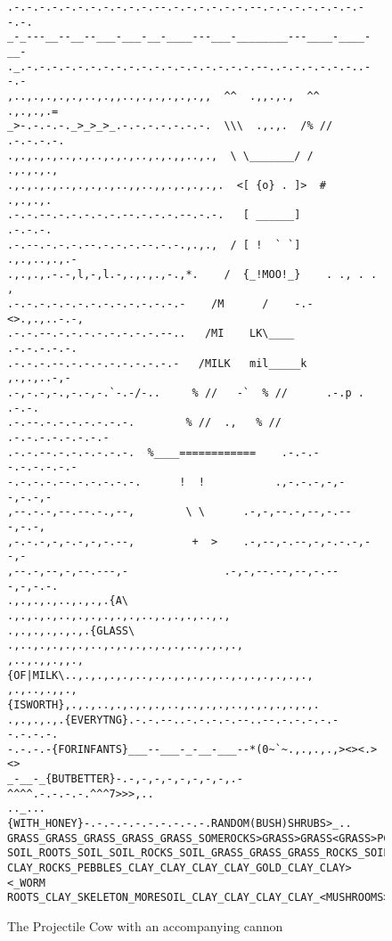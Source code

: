 \documentclass{metanorma}
\begin{document}
\begin{figure}[h]\centering
  \label{projectile-cow}
  \caption{The Projectile Cow with an accompanying cannon}
  \begin{verbatim}
.-.-.-.-.-.-.-.-.-.-.-.--.-.-.-.-.-.-.--.-.-.-.-.-.-.-.--.-.
_-_---__--__--___-___-__-____---___-________---____-____-__-
._.-.-.-.-.-.-.-.-.-.-.-.-.-.-.-.-.-.-.--..-.-.-.-.-.-..--.-
,..,.,.,.,.,..,.,,..,.,.,.,.,.,,  ^^  .,,.,.,  ^^   .,.,.,.=
_>-.-.-.-._>_>_>_.-.-.-.-.-.-.-.  \\\  .,.,.  /% // .-.-.-.-.
.,.,.,.,..,.,..,.,.,..,.,.,,..,.,  \ \_______/ /    .,.,.,.,
.,.,.,.,..,.,.,.,..,,..,,.,.,.,.,.  <[ {o} . ]>  #   .,.,.,.
.-.-.--.-.-.-.-.-.--.-.-.-.--.-.-.   [ ______]       .-.-.-.
.-.--.-.-.-.--.-.-.-.--.-.-.,.,.,  / [ !  ` `]   .,.,..,.,.-
.,.,.,.-.-,l,-,l.-,.,.,.,-.,*.    /  {_!MOO!_}    . ., . . ,
.-.-.-.-.-.-.-.-.-.-.-.-.-.-    /M      /    -.-<>.,.,..-.-,
.-.-.--.-.-.-.-.-.-.-.-.--..   /MI    LK\____    .-.-.-.-.-.
.-.-.-.--.-.-.-.-.-.-.-.-.-   /MILK   mil_____k   ,.,.,..-,-
.-,-.-,-.,-.-,-.`-.-/-..     % //   -`  % //      .-.p . .-.-.
.-.--.-.-.-.-.-.-.-.        % //  .,   % //   .-.-.-.-.-.-.-.-
.-.-.--.-.-.-.-.-.-.  %____============    .-.-.--.-.-.-.-.-
-.-.-.-.--.-.-.-.-.-.      !  !           .,-.-.-,-,--,-.-,-
,--.-.-,--.--.-.,--,        \ \      .-,-,--.-,--,-.---,-.-,
,-.-.-,-,-.-,-,-.--,         +  >    .-,--,-.--,-,-.-.-,--,-
,--.-,--,-,--.---,-               .-,-,--.--,--,-.---,-,-.-.
.,.,.,.,..,.,.,.{A\      .,.,.,.,..,.,.,.,.,.,..,.,.,.,..,.,
.,.,.,.,.,.,.{GLASS\   .,..,.,.,.,.,..,.,.,.,.,.,.,..,.,.,.,
,..,.,,.,,.,{OF|MILK\..,.,.,.,.,..,.,.,.,.,.,..,.,.,.,.,.,.,
,.,..,.,,.,{ISWORTH},.,.,..,.,.,.,.,..,..,.,.,..,.,.,.,.,.,.
.,.,.,.,.{EVERYTNG}.-.-.--..-.-.-.-.--..--.-.-.-.-.--.-.-.-.
-.-.-.-{FORINFANTS}___--___-_-__-___--*(0~`~.,.,.,.,><><.><>
_-__-_{BUTBETTER}-.-,-,-,-,-,-,-,-,.-^^^^.-.-.-.-.^^^7>>>,..
.._...{WITH_HONEY}-.-.-.-.-.-.-.-.-.-.RANDOM(BUSH)SHRUBS>_..
GRASS_GRASS_GRASS_GRASS_GRASS_SOMEROCKS>GRASS>GRASS<GRASS>PC
SOIL_ROOTS_SOIL_SOIL_ROCKS_SOIL_GRASS_GRASS_GRASS_ROCKS_SOIL
CLAY_ROCKS_PEBBLES_CLAY_CLAY_CLAY_CLAY_GOLD_CLAY_CLAY><_WORM
ROOTS_CLAY_SKELETON_MORESOIL_CLAY_CLAY_CLAY_CLAY_<MUSHROOMS>
  \end{verbatim}
\end{figure}
\end{document}
